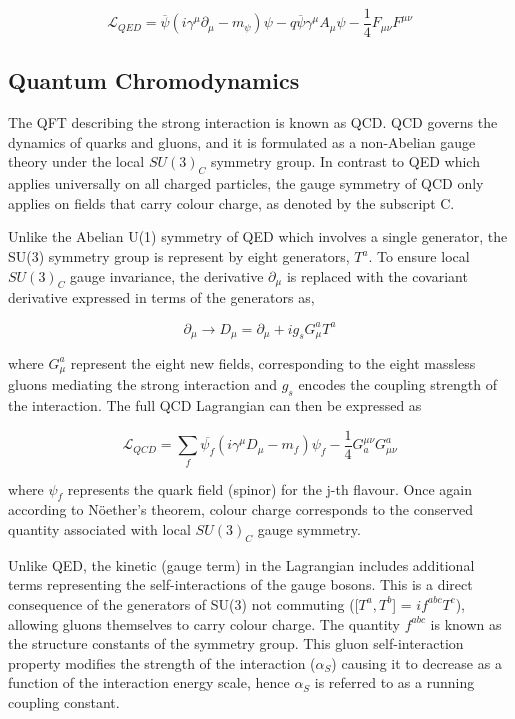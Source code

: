 \begin{equation}
    \mathcal{L}_{QED} = \overline{\psi}(i\gamma^\mu \partial_\mu - m_{\psi}) \psi - q\overline{\psi}\gamma^\mu A_\mu\psi - \frac{1}{4}F_{\mu\nu}F^{\mu\nu}
\label{Equation:Dirac_GaugeInvariant}
\end{equation}

\subsection{Quantum Chromodynamics}

The QFT describing the strong interaction is known as \ac{QCD}. QCD governs the dynamics of quarks and gluons, and it is formulated as a non-Abelian gauge theory under the local $SU(3)_C$ symmetry group. In contrast to QED which applies universally on all charged particles, the gauge symmetry of QCD only applies on fields that carry colour charge, as denoted by the subscript C.

Unlike the Abelian U(1) symmetry of QED which involves a single generator, the SU(3) symmetry group is represent by eight generators, $T^a$. To ensure local $SU(3)_C$ gauge invariance, the derivative $\partial_\mu$ is replaced with the covariant derivative expressed in terms of the generators as,

\begin{equation}
    \partial_\mu \rightarrow D_\mu = \partial_\mu + ig_sG^{a}_{\mu}T^{a}
\end{equation}

where $G^{a}_{\mu}$ represent the eight new fields, corresponding to the eight massless gluons mediating the strong interaction and $g_s$ encodes the coupling strength of the interaction. The full QCD Lagrangian can then be expressed as

\begin{equation} 
\mathcal{L}_{QCD} = \sum_{f}\overline{\psi_f}(i\gamma^\mu D_\mu - m_f)\psi_f - \frac{1}{4} G^{\mu\nu}_{a}G^{a}_{\mu\nu}
\end{equation}

where $\psi_f$ represents the quark field (spinor) for the j-th flavour. Once again according to N\"{o}ether's theorem, colour charge corresponds to the conserved quantity associated with local $SU(3)_C$ gauge symmetry.

Unlike QED, the kinetic (gauge term) in the Lagrangian includes additional terms representing the self-interactions of the gauge bosons. This is a direct consequence of the generators of SU(3) not commuting ([$T^a,T^b$] = $if^{abc}T^c$), allowing gluons themselves to carry colour charge. The quantity $f^{abc}$ is known as the structure constants of the symmetry group. This gluon self-interaction property modifies the strength of the interaction ($\alpha_{S}$) causing it to decrease as a function of the interaction energy scale, hence $\alpha_{S}$ is referred to as a running coupling constant.

